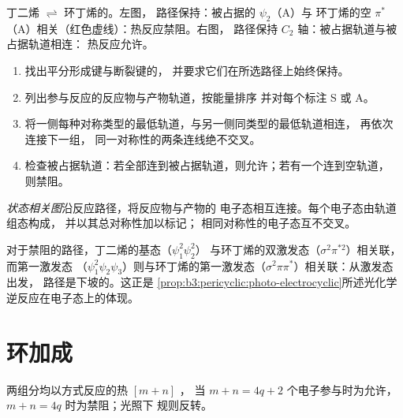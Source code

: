\begin{omfigure}
{\small 丁二烯 $\rightleftharpoons$ 环丁烯的。左图，
路径保持：被占据的 $\psi_2$（A）与
环丁烯的空 $\pi^*$（A）相关（红色虚线）：热反应禁阻。右图，
路径保持 $C_2$ 轴：被占据轨道与被占据轨道相连：
热反应允许。}
\end{omfigure}

\begin{method}[绘制相关图]\label{met:b3:pericyclic:correlation-diagram}
\begin{enumerate}
  \item 找出平分形成键与断裂键的，
        并要求它们在所选路径上始终保持。
  \item 列出参与反应的反应物与产物轨道，按能量排序
        并对每个标注 S 或 A。
  \item 将一侧每种对称类型的最低轨道，与另一侧同类型的最低轨道相连，
        再依次连接下一组，
        同一对称性的两条连线绝不交叉。
  \item 检查被占据轨道：若全部连到被占据轨道，则允许；若有一个连到空轨道，
        则禁阻。
\end{enumerate}
\end{method}

\begin{definition}[状态相关图]\label{def:b3:pericyclic:state-correlation}
\emph{状态相关图}沿反应路径，将反应物与产物的
电子态相互连接。每个电子态由轨道组态构成，
并以其总对称性加以标记；
相同对称性的电子态互不交叉。
\end{definition}

对于禁阻的路径，丁二烯的基态（$\psi_1^2\psi_2^2$）
与环丁烯的双激发态（$\sigma^2\pi^{*2}$）相关联，而第一激发态
（$\psi_1^2\psi_2\psi_3$）则与环丁烯的第一激发态（$\sigma^2\pi\pi^*$）相关联：从激发态出发，
路径是下坡的。这正是
\cref{prop:b3:pericyclic:photo-electrocyclic}所述光化学逆反应在电子态上的体现。

\section{环加成}

\begin{theorem}[环加成]\label{thm:b3:pericyclic:cycloaddition}
两组分均以方式反应的热 $[m + n]$ ，
当 $m + n = 4q + 2$ 个电子参与时为允许，$m + n = 4q$ 时为禁阻；光照下
规则反转。
\end{theorem}

